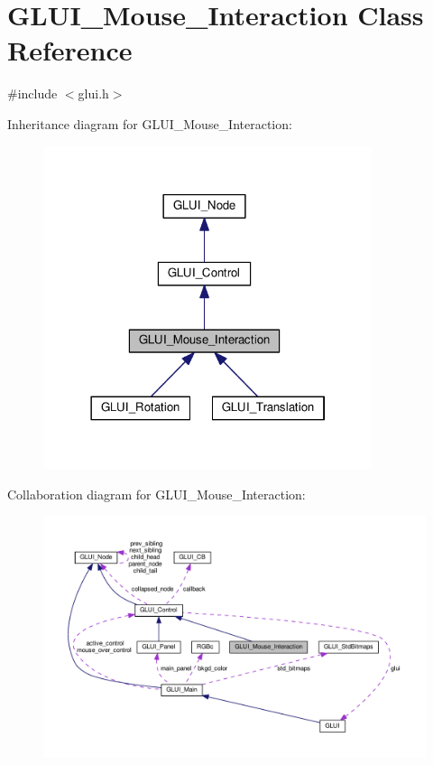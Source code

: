\hypertarget{class_g_l_u_i___mouse___interaction}{\section{G\+L\+U\+I\+\_\+\+Mouse\+\_\+\+Interaction Class Reference}
\label{class_g_l_u_i___mouse___interaction}
}


{\ttfamily \#include $<$glui.\+h$>$}



Inheritance diagram for G\+L\+U\+I\+\_\+\+Mouse\+\_\+\+Interaction\+:\nopagebreak
\begin{figure}[H]
\begin{center}
\leavevmode
\includegraphics[width=273pt]{class_g_l_u_i___mouse___interaction__inherit__graph}
\end{center}
\end{figure}


Collaboration diagram for G\+L\+U\+I\+\_\+\+Mouse\+\_\+\+Interaction\+:\nopagebreak
\begin{figure}[H]
\begin{center}
\leavevmode
\includegraphics[width=350pt]{class_g_l_u_i___mouse___interaction__coll__graph}
\end{center}
\end{figure}
